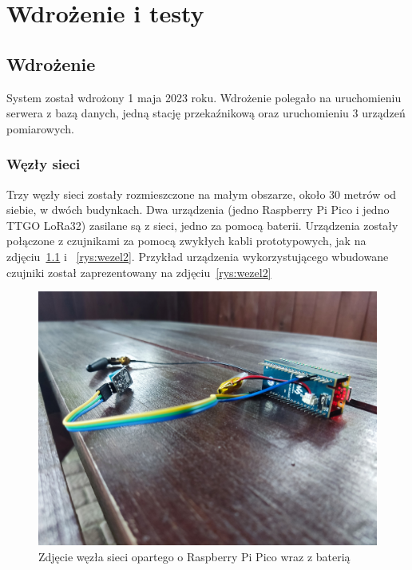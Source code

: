 \chapter{Wdrożenie i testy}

\section{Wdrożenie}
System został wdrożony 1 maja 2023 roku. Wdrożenie polegało na uruchomieniu serwera z bazą danych, jedną stację przekaźnikową oraz uruchomieniu 3 urządzeń pomiarowych.

\subsection{Węzły sieci}

Trzy węzły sieci zostały rozmieszczone na małym obszarze, około 30 metrów od siebie, w dwóch budynkach. Dwa urządzenia (jedno Raspberry Pi Pico i jedno TTGO LoRa32) zasilane są z sieci, jedno za pomocą baterii. Urządzenia zostały połączone z czujnikami za pomocą zwykłych kabli prototypowych, jak na zdjęciu~\ref{rys:wezel1} i ~\ref{rys:wezel2}. Przykład urządzenia wykorzystującego wbudowane czujniki został zaprezentowany na zdjęciu~\ref{rys:wezel2}

\begin{figure}[b!]
    \begin{center}
        \includegraphics[width=13cm]{pic/wezel1.jpg}
    \end{center}
    \caption{Zdjęcie węzła sieci opartego o Raspberry Pi Pico wraz z baterią}\label{rys:wezel1}
\end{figure}

